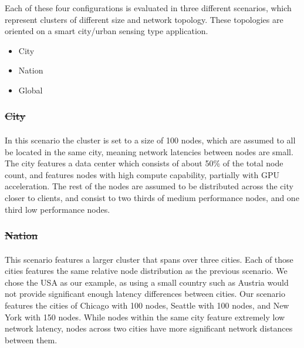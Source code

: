 \documentclass[draft,final]{vutinfth} %
\providecommand{\DIFaddtex}[1]{{\protect\color{blue}\uwave{#1}}} %
\providecommand{\DIFdeltex}[1]{{\protect\color{red}\sout{#1}}}                      %
\providecommand{\DIFaddbegin}{} %
\providecommand{\DIFaddend}{} %
\providecommand{\DIFdelbegin}{} %
\providecommand{\DIFdelend}{} %
\providecommand{\DIFadd}[1]{\texorpdfstring{\DIFaddtex{#1}}{#1}} %
\providecommand{\DIFdel}[1]{\texorpdfstring{\DIFdeltex{#1}}{}} %
\begin{document}
Each of these four configurations is evaluated in three different scenarios, which represent clusters of different size and network topology.
These topologies are oriented on a smart city/urban sensing type application.
\begin{itemize}
    \item City
    \item Nation
    \item Global
\end{itemize}
\DIFdelbegin \subsubsection{\DIFdel{City}}
\addtocounter{subsubsection}{-1}%
\DIFdelend \DIFaddbegin \paragraph{\DIFadd{City}}
\DIFaddend In this scenario the cluster is set to a size of 100 nodes, which are assumed to all be located in the same city, meaning network latencies between nodes are small.
The city features a data center which consists of about 50\% of the total node count, and features nodes with high compute capability, partially with GPU acceleration.
The rest of the nodes are assumed to be distributed across the city closer to clients, and consist to two thirds of medium performance nodes, and one third low performance nodes.
\DIFdelbegin \subsubsection{\DIFdel{Nation}}
\addtocounter{subsubsection}{-1}%
\DIFdelend \DIFaddbegin \paragraph{\DIFadd{Nation}}
\DIFaddend This scenario features a larger cluster that spans over three cities.
Each of those cities features the same relative node distribution as the previous scenario.
We chose the USA as our example, as using a small country such as Austria would not provide significant enough latency differences between cities.
Our scenario features the cities of Chicago with 100 nodes, Seattle with 100 nodes, and New York with 150 nodes.
While nodes within the same city feature extremely low network latency, nodes across two cities have more significant network distances between them.
\end{document}
